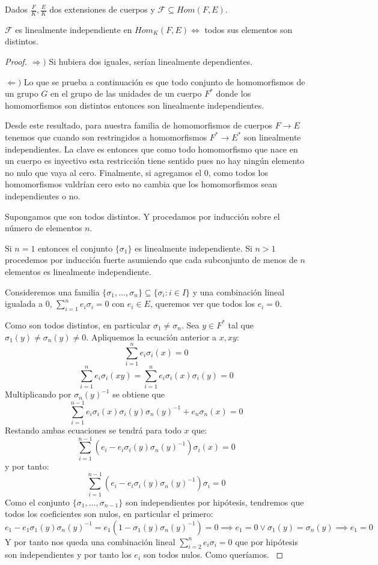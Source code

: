\begin{lemma}
Dados $\frac{F}{K},\frac{E}{K}$ dos extensiones de cuerpos y $\mathcal{F} \subseteq Hom(F,E)$. 

$\mathcal{F}$ es linealmente independiente en $Hom_K(F,E) \iff$ todos sus elementos son distintos. 
\end{lemma}
\begin{proof}
$\Rightarrow)$ Si hubiera dos iguales, serían linealmente dependientes. 

$\Leftarrow)$ Lo que se prueba a continuación es que todo conjunto de homomorfismos de un grupo $G$ en el grupo de las unidades de un cuerpo $F^*$ donde los homomorfismos son distintos entonces son linealmente independientes. 

Desde este resultado, para nuestra familia de homomorfismos de cuerpos $F \to E$ tenemos que cuando son restringidos a homomorfismos $F^* \to E^*$ son linealmente independientes. La clave es entonces que como todo homomorfismo que nace en un cuerpo es inyectivo esta restricción tiene sentido pues no hay ningún elemento no nulo que vaya al cero. Finalmente, si agregamos el $0$, como todos los homomorfismos valdrían cero esto no cambia que los homomorfismos sean independientes o no. 

Supongamos que son todos distintos. Y procedamos por inducción sobre el número de elementos $n$. 

Si $n = 1$ entonces el conjunto $\{\sigma_1\}$ es linealmente independiente. Si $n > 1$ procedemos por inducción fuerte asumiendo que cada subconjunto de menos de $n$ elementos es linealmente independiente. 

Consideremos una familia $\{\sigma_1, \ldots, \sigma_n \} \subseteq \{\sigma_i:i \in I \}$ y una combinación lineal igualada a $0$, $\sum_{i = 1}^n e_i\sigma_i = 0$ con $e_i \in E$, queremos ver que todos los $e_i = 0$. 

Como son todos distintos, en particular $\sigma_1 \neq \sigma_n$. Sea $y \in F^*$ tal que $\sigma_1(y) \neq \sigma_n(y) \neq 0$. Apliquemos la ecuación anterior a $x,xy$: $$\sum_{i = 1}^n e_i\sigma_i(x) = 0$$ $$\sum_{i = 1}^n e_i\sigma_i(xy) = \sum_{i = 1}^n  e_i\sigma_i(x)\sigma_i(y) = 0$$ Multiplicando por $\sigma_n(y)^{-1}$ se obtiene que $$\sum_{i = 1}^{n-1} e_i\sigma_i(x)\sigma_i(y)\sigma_n(y)^{-1} + e_n \sigma_n(x) = 0$$ Restando ambas ecuaciones se tendrá para todo $x$ que: $$\sum_{i = 1}^{n-1} (e_i-e_i\sigma_i(y)\sigma_n(y)^{-1})\sigma_i(x) = 0$$ y por tanto: $$\sum_{i = 1}^{n-1} (e_i-e_i\sigma_i(y)\sigma_n(y)^{-1})\sigma_i = 0$$ Como el conjunto $\{\sigma_1,\ldots,\sigma_{n-1}\}$ son independientes por hipótesis, tendremos que todos los coeficientes son nulos, en particular el primero: $$e_1 - e_1 \sigma_1(y)\sigma_n(y)^{-1} = e_1(1 - \sigma_1(y)\sigma_n(y)^{-1}) = 0 \implies e_1 = 0 \lor \sigma_1(y) = \sigma_n(y) \implies e_1 = 0$$ Y por tanto nos queda una combinación lineal $\sum_{i = 2}^{n} e_i\sigma_i = 0$ que por hipótesis son independientes y por tanto los $e_i$ son todos nulos. Como queríamos. $  $
\end{proof}


